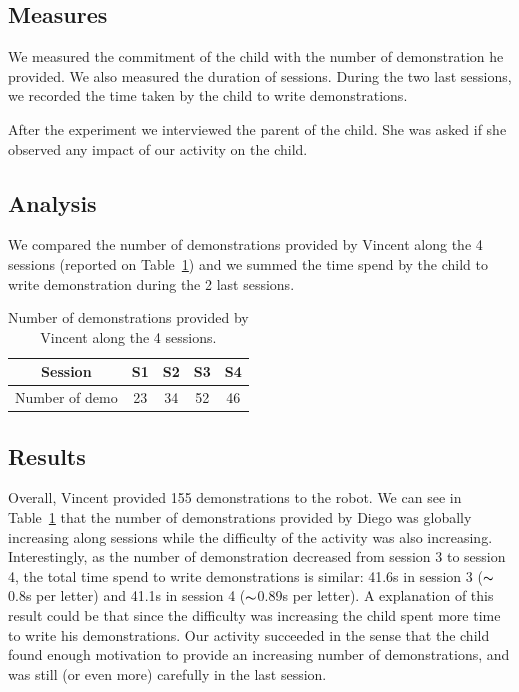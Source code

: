 \documentclass[conference]{IEEEtran}
\begin{document}
\subsection{Measures}

We measured the commitment of the child with the number of demonstration he provided. We also measured the duration of sessions. During the two last sessions, we recorded the time taken by the child to write demonstrations.

After the experiment we interviewed the parent of the child. She was asked if she observed any impact of our activity on the child.


\subsection{Analysis}

We compared the number of demonstrations provided by Vincent along the 4 sessions (reported on Table~\ref{table:vincent_sess}) and we summed the time spend by the child to write demonstration during the 2 last sessions.
\begin{table}
    \centering
    \begin{tabular}{|c|c|c|c|c|}
        \hline
        Session & S1 & S2 & S3 & S4\\ \hline
        Number of demo & 23 & 34 & 52 & 46\\ \hline

    \end{tabular}
    \caption{\footnotesize Number of demonstrations provided by Vincent along the 4 sessions.}
    \label{table:vincent_sess}
\end{table}
\subsection{Results}
Overall, Vincent provided 155 demonstrations to the robot. We can see in Table~\ref{table:vincent_sess} that the number of demonstrations provided by Diego was globally increasing along sessions while the difficulty of the activity was also increasing. Interestingly, as the number of demonstration decreased from session 3 to session 4, the total time spend to write demonstrations is similar: 41.6s in session 3 ($\thicksim$0.8s per letter) and 41.1s in session 4 ($\thicksim$0.89s per letter). A explanation of this result could be that since the difficulty was increasing the child spent more time to write his demonstrations. Our activity succeeded in the sense that the child found enough motivation to provide an increasing number of demonstrations, and was still (or even more) carefully in the last session.
\end{document}
